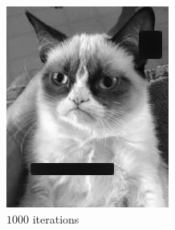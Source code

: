 \documentclass{paper}
\begin{document}
\begin{figure}[ht]
\vspace{3mm}
\begin{subfigure}[h]{0.3\textwidth}
	\centering
	\includegraphics[width=\textwidth]{cat-iter1000-lambda1000-alpha0_0005}
	\caption*{$1000$ iterations}
\end{subfigure}
~
\begin{subfigure}[h]{0.3\textwidth}
	\centering

\end{subfigure}
\end{figure}
\end{document}
